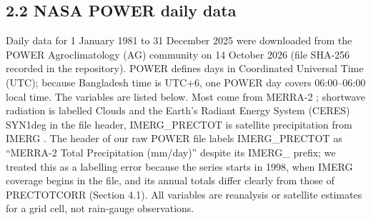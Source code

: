\documentclass[
]{article}
\begin{document}
\hypertarget{nasa-power-daily-data}{%
\subsection{2.2 NASA POWER daily data}\label{nasa-power-daily-data}}

Daily data for 1 January 1981 to 31 December 2025 were downloaded from the POWER Agroclimatology (AG) community on 14 October 2026 (file SHA-256 recorded in the repository). POWER defines days in Coordinated Universal Time (UTC); because Bangladesh time is UTC+6, one POWER day covers 06:00--06:00 local time. The variables are listed below. Most come from MERRA-2 \citep{gelaro2017}; shortwave radiation is labelled Clouds and the Earth's Radiant Energy System (CERES) SYN1deg in the file header, IMERG\_PRECTOT is satellite precipitation from IMERG \citep{huffman2020}. The header of our raw POWER file labels IMERG\_PRECTOT as ``MERRA-2 Total Precipitation (mm/day)'' despite its IMERG\_ prefix; we treated this as a labelling error because the series starts in 1998, when IMERG coverage begins in the file, and its annual totals differ clearly from those of PRECTOTCORR (Section 4.1). All variables are reanalysis or satellite estimates for a grid cell, not rain-gauge observations.
\end{document}
